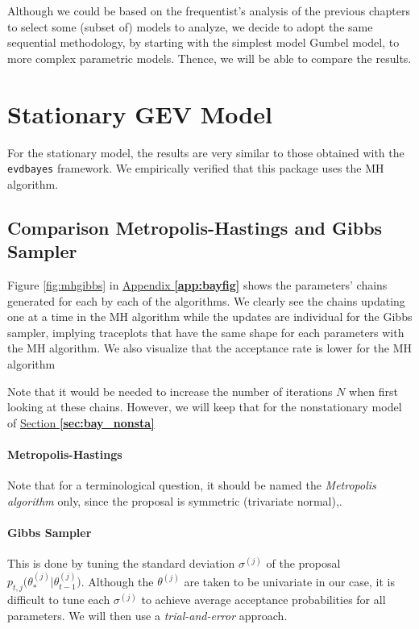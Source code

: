 Although we could be based on the frequentist's analysis of the previous chapters to select some (subset of) models to analyze, we decide to adopt the same sequential methodology, by starting with the simplest model Gumbel model, to more complex parametric models. 
Thence, we will be able to compare the results.


\section{Stationary GEV Model}\label{sec:baystatio}


For the stationary model, the results are very similar to those obtained with the \texttt{evdbayes} framework. We empirically verified that this package uses the MH algorithm.


\subsection{Comparison Metropolis-Hastings and Gibbs Sampler}



Figure \ref{fig:mhgibbs} in \hyperref[app:bayfig]{Appendix \textbf{\ref{app:bayfig}}}
shows the parameters' chains generated for each by each of the algorithms. 
We clearly see the chains updating one at a time in the MH algorithm while the updates are individual for the Gibbs sampler, implying traceplots that have the same shape for each parameters with the MH algorithm. We also visualize that the acceptance rate is lower for the MH algorithm

Note that it would be needed to increase the number of iterations $N$ when first looking at these chains. However, we will keep that for the nonstationary model of \hyperref[sec:bay_nonsta]{Section \textbf{\ref{sec:bay_nonsta}}}


\paragraph*{Metropolis-Hastings}

Note that for a terminological question, it should be named the \emph{Metropolis algorithm} only, since the proposal is symmetric (trivariate normal),.

\paragraph*{Gibbs Sampler}

This is done by tuning the standard deviation $\sigma^{(j)}$ of the proposal $p_{t,j}\big(\theta_*^{(j)}|\theta_{t-1}^{(j)}\big)$. Although the $\theta^{(j)}$ are taken to be univariate in our case, it is difficult to tune each $\sigma^{(j)}$ to achieve average acceptance probabilities for all parameters. We will then use a \emph{trial-and-error} approach.




